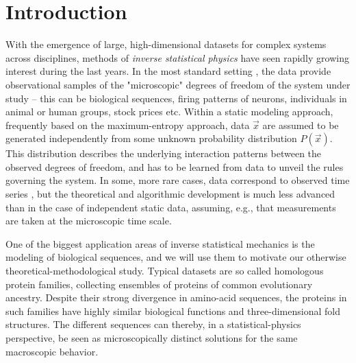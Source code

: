 \documentclass[preprint,amsmath,amssymb,superscriptaddress,showpacs,pre]{revtex4-1}
\begin{document}
\maketitle


\section{Introduction}
\label{sec:int}

With the emergence of large, high-dimensional datasets for complex systems across disciplines, methods of {\it inverse statistical physics} have seen rapidly growing interest during the last years. In the most standard setting , the data provide observational samples of the "microscopic" degrees of freedom of the system under study -- this can be biological sequences, firing patterns of neurons, individuals in animal or human groups, stock prices etc. Within a static modeling approach, frequently based on the maximum-entropy approach, data $\vec x$ are assumed to be generated independently from some unknown probability distribution $P(\vec x)$. This distribution describes the underlying interaction patterns between the observed degrees of freedom, and has to be learned from data to unveil the rules governing the system. In some, more rare cases, data correspond to observed time series , but the theoretical and algorithmic development is much less advanced than in the case of independent static data, assuming, e.g., that measurements are taken at the microscopic time scale.

One of the biggest application areas of inverse statistical mechanics is the modeling of biological sequences, and we will use them to motivate our otherwise theoretical-methodological study. Typical datasets are so called homologous protein families, collecting ensembles of proteins of common evolutionary ancestry. Despite their strong divergence in amino-acid sequences, the proteins in such families have highly similar biological functions and three-dimensional fold structures. The different sequences can thereby, in a statistical-physics perspective, be seen as microscopically distinct solutions for the same macroscopic behavior.
\end{document}
